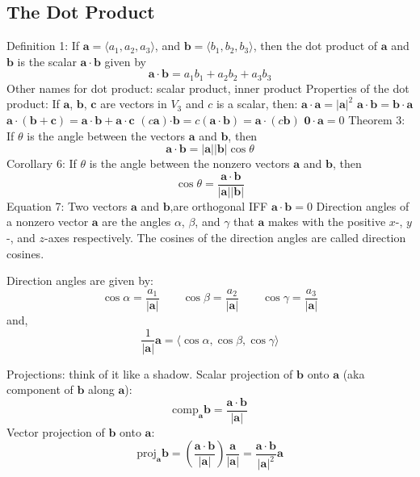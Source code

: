 \documentclass{article}
\begin{document}
\begin{multicols}{2}
    \subsection{The Dot Product}
    \begin{outline}
        \1 Definition 1: If \(\mathbf a=\langle a_1,a_2,a_3\rangle\), and \(\mathbf b=\langle b_1,b_2,b_3\rangle\), then the dot product of \(\mathbf a\) and \(\mathbf b\) is the scalar \(\mathbf{a\cdot b}\) given by \[\mathbf{a\cdot b}=a_1b_1+a_2b_2+a_3b_3\]
        \1 Other names for dot product: scalar product, inner product
        \1 Properties of the dot product: If \(\mathbf a\), \(\mathbf b\), \(\mathbf c\) are vectors in \(V_3\) and $c$ is a scalar, then: 
            \2 \(\mathbf{a\cdot a}=|\mathbf a|^2\)
            \2 \(\mathbf{a\cdot b}=\mathbf{b\cdot a}\)
            \2 \(\mathbf{a\cdot}(\mathbf{b+c})=\mathbf{a\cdot b+a\cdot c}\)
            \2 \((c\mathbf a)\mathbf{\cdot b}=c(\mathbf{a\cdot b})=\mathbf{a\cdot}(c\mathbf b)\)
            \2 \(\mathbf{0\cdot a}=0\)
        \1 Theorem 3: If \(\theta\) is the angle between the vectors \(\mathbf a\) and \(\mathbf b\), then \[\mathbf{a\cdot b}=|\mathbf a||\mathbf b|\cos\theta\]
        \1 Corollary 6: If \(\theta\) is the angle between the nonzero vectors \(\mathbf a\) and \(\mathbf b\), then \[\cos\theta=\dfrac{\mathbf{a\cdot b}}{|\mathbf a||\mathbf b|}\]
        \1 Equation 7: Two vectors \(\mathbf a\) and \(\mathbf b\),are orthogonal IFF \(\mathbf{a\cdot b}=0\)
        \1 Direction angles of a nonzero vector \(\mathbf a\) are the angles \(\alpha\), \(\beta\), and \(\gamma\) that \(\mathbf a\) makes with the positive \(x\)-, \(y\)-, and \(z\)-axes respectively. The cosines of the direction angles are called direction cosines. 
    \end{outline}
    \end{multicols}\begin{outline}
        \1 Direction angles are given by: \[\cos\alpha=\dfrac{a_1}{|\mathbf a|}\qquad\cos\beta=\dfrac{a_2}{|\mathbf a|}\qquad\cos\gamma=\dfrac{a_3}{|\mathbf a|}\] and, \[\dfrac{1}{|\mathbf a|}\mathbf a=\langle\cos\alpha,\cos\beta,\cos\gamma\rangle\]
    \end{outline}\begin{multicols}{2}\begin{outline}
        \1 Projections: think of it like a shadow. 
        \1 Scalar projection of \(\mathbf b\) onto \(\mathbf a\) (aka component of \(\mathbf b\) along \(\mathbf{a}\)): \[\text{comp}_{\mathbf a}\mathbf b=\dfrac{\mathbf{a\cdot b}}{|\mathbf a|}\]
        \1 Vector projection of \(\mathbf b\) onto \(\mathbf a\): \[\text{proj}_{\mathbf a}\mathbf b=\left(\dfrac{\mathbf{a\cdot b}}{|\mathbf a|}\right)\dfrac{\mathbf a}{|\mathbf a|}=\dfrac{\mathbf{a\cdot b}}{|\mathbf a|^2}\mathbf a\]


\end{outline}
\end{multicols}
\end{document}

